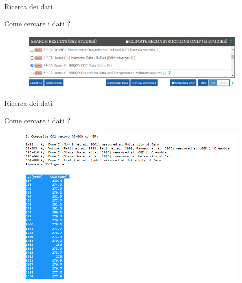 \documentclass{beamer}
\begin{document}
\begin{frame}{Ricerca dei dati}
\begin{center}
Come cercare i dati ? 
\end{center}
\begin{figure}
\begin{center}
\includegraphics[width=\textwidth ]{Pic/NOAA_2.png}
\end{center}
\end{figure}
\end{frame}


\begin{frame}{Ricerca dei dati}
\begin{center}
Come cercare i dati ? 
\end{center}
\begin{figure}
\begin{center}
\includegraphics[width=\textwidth ]{Pic/CO2_data.png}
\end{center}
\end{figure}
\end{frame}
\end{document}

